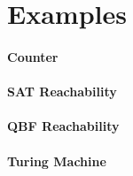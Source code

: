 \documentclass[runningheads]{llncs}
\begin{document}
\section{Examples}

\paragraph{Counter}
\paragraph{SAT Reachability}
\paragraph{QBF Reachability}
\paragraph{Turing Machine}
\end{document}

